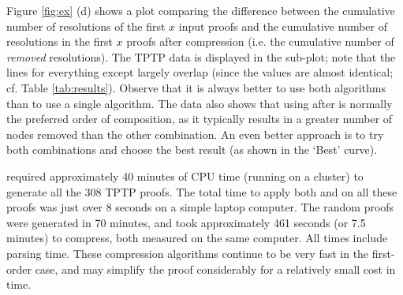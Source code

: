 Figure \ref{fig:ex} (d) shows a plot comparing the difference between the cumulative number of resolutions of the first $x$ input proofs and the cumulative number of resolutions in the first $x$ proofs after compression (i.e. the cumulative number of \emph{removed} resolutions). 
The TPTP data is displayed in the sub-plot; note that the lines for everything except {\FORPI} largely overlap (since the values are almost identical; cf. Table \ref{tab:results}). 
Observe that it is always better to use both algorithms than to use a single algorithm. 
The data also shows that using {\FORPI} after {\GFOLU} is normally the preferred order of composition, as it typically results in a greater number of nodes removed than the other combination. 
An even better approach is to try both combinations and choose the best result (as shown in the `Best' curve).  


{\SPASS} required approximately 40 minutes of CPU time (running on a cluster) to generate all the 308 TPTP proofs. 
The total time to apply both {\FORPI} and {\GFOLU} on all these proofs was just over 8 seconds on a simple laptop computer. 
The random proofs were generated in 70 minutes, and took approximately 461 seconds (or 7.5 minutes) to compress, both measured on the same computer.
All times include parsing time. 
These compression algorithms continue to be very fast in the first-order case, and may simplify the proof considerably for a relatively small cost in time.
